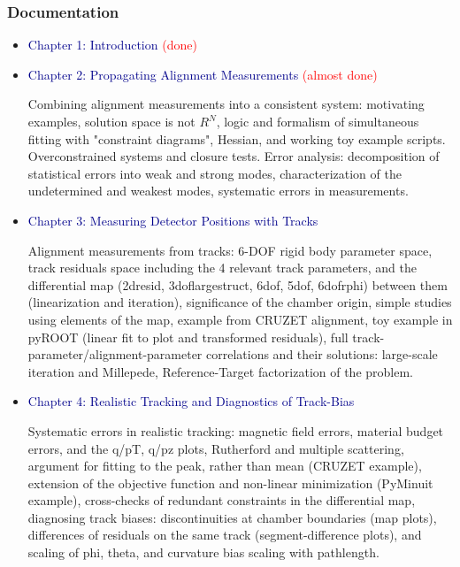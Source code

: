 \documentclass[compress]{beamer}
\begin{document}
\begin{frame}
\frametitle{Documentation}

\begin{itemize}
\item \textcolor{darkblue}{Chapter 1: Introduction} \textcolor{red}{(done)}

\item \textcolor{darkblue}{Chapter 2: Propagating Alignment Measurements} \textcolor{red}{(almost done)}

\begin{minipage}{\linewidth}
\tiny Combining alignment measurements into a consistent system:
motivating examples, solution space is not $R^N$, logic and formalism
of simultaneous fitting with "constraint diagrams", Hessian, and
working toy example scripts.  Overconstrained systems and closure
tests.  Error analysis: decomposition of statistical errors into weak
and strong modes, characterization of the undetermined and weakest
modes, systematic errors in measurements.
\end{minipage}

\item \textcolor{darkblue}{Chapter 3: Measuring Detector Positions with Tracks}

\begin{minipage}{\linewidth}
\tiny Alignment measurements from tracks: 6-DOF rigid body parameter
space, track residuals space including the 4 relevant track
parameters, and the differential map (2dresid, 3doflargestruct,
6dof, 5dof, 6dofrphi) between them (linearization and iteration),
significance of the chamber origin, simple studies using elements
of the map, example from CRUZET alignment, toy example in pyROOT
(linear fit to plot and transformed residuals), full
track-parameter/alignment-parameter correlations and their
solutions: large-scale iteration and Millepede, Reference-Target
factorization of the problem.
\end{minipage}

\item \textcolor{darkblue}{Chapter 4: Realistic Tracking and Diagnostics of Track-Bias}

\begin{minipage}{\linewidth}
\tiny Systematic errors in realistic tracking: magnetic field errors,
material budget errors, and the q/pT, q/pz plots, Rutherford and
multiple scattering, argument for fitting to the peak, rather than
mean (CRUZET example), extension of the objective function and
non-linear minimization (PyMinuit example), cross-checks of
redundant constraints in the differential map, diagnosing track
biases: discontinuities at chamber boundaries (map plots),
differences of residuals on the same track (segment-difference
plots), and scaling of phi, theta, and curvature bias scaling with
pathlength.
\end{minipage}


\end{itemize}
\end{frame}
\end{document}
